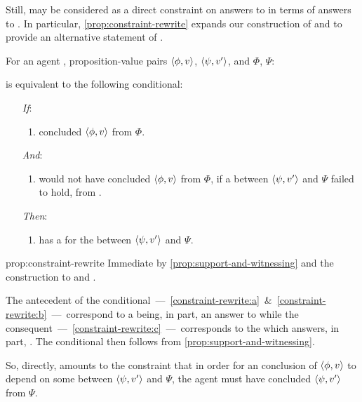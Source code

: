 \begin{note}
  Still, \issueConstraint{} may be considered as a direct constraint on answers to \qWhyV{} in terms of answers to \qHow{}.
  In particular, \autoref{prop:constraint-rewrite} expands our construction of \qWhyV{}  and \qHowV{} to provide an alternative statement of \issueConstraint{}.

  \begin{proposition}
    \label{prop:constraint-rewrite}
    For an agent \vAgent{}, proposition-value pairs \(\langle \phi, v \rangle\), \(\langle \psi, v' \rangle\), and  \(\Phi\), \(\Psi\):

    \issueConstraint{} is equivalent to the following conditional:

    \begin{enumerate}
    \item[\emph{If}:]
      \begin{enumerate}[label=\alph*., ref=(\alph*)]
      \item
        \label{constraint-rewrite:a}
        \vAgent{} concluded \(\langle \phi, v \rangle\) from \(\Phi\).
      \end{enumerate}
    \item[\emph{And}:]
      \begin{enumerate}[label=\alph*., ref=(\alph*), resume]
      \item
        \label{constraint-rewrite:b}
        \vAgent{} would not have concluded \(\langle \phi, v \rangle\) from \(\Phi\), if a \ros{} between \(\langle \psi, v' \rangle\) and \(\Psi\) failed to hold, from .
      \end{enumerate}
    \item[\emph{Then}:]
      \begin{enumerate}[label=\alph*., ref=(\alph*), resume]
      \item
        \label{constraint-rewrite:c}
        \vAgent{} has a  for the \ros{} between \(\langle \psi, v' \rangle\) and \(\Psi\).
      \end{enumerate}
    \end{enumerate}
  \end{proposition}

  \begin{argument}{prop:constraint-rewrite}
    Immediate by \autoref{prop:support-and-witnessing} and the construction to \qWhyV{} and \qHowV{}.

    The antecedent of the conditional~---~\ref{constraint-rewrite:a}~\&~\ref{constraint-rewrite:b}~---~correspond to a \ros{} being, in part, an answer to \qWhyV{} while the consequent~---~\ref{constraint-rewrite:c}~---~corresponds to the  which answers, in part, \qHowV{}.
    The conditional then follows from \autoref{prop:support-and-witnessing}.
  \end{argument}


  So, directly, \issueConstraint{} amounts to the constraint that in order for an \agents{} conclusion of \(\langle \phi, v \rangle\) to depend on some \ros{} between \(\langle \psi, v' \rangle\) and \(\Psi\), the agent must have concluded \(\langle \psi, v' \rangle\) from \(\Psi\).
\end{note}



